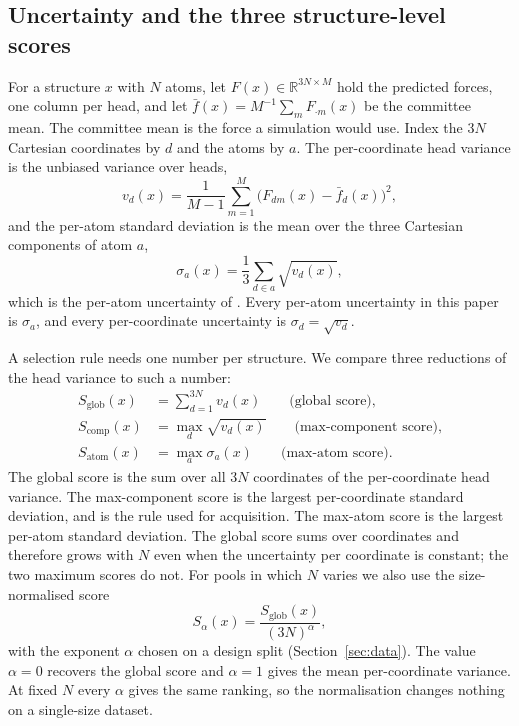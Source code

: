 \subsection{Uncertainty and the three structure-level scores}
\label{sec:scores}

For a structure $x$ with $N$ atoms, let $F(x)\in\mathbb{R}^{3N\times M}$ hold
the predicted forces, one column per head, and let
$\bar f(x)=M^{-1}\sum_{m}F_{\cdot m}(x)$ be the committee mean. The committee
mean is the force a simulation would use. Index the $3N$ Cartesian coordinates
by $d$ and the atoms by $a$. The per-coordinate head variance is the unbiased
variance over heads,
\begin{equation}
v_d(x)=\frac{1}{M-1}\sum_{m=1}^{M}\bigl(F_{dm}(x)-\bar f_d(x)\bigr)^2 ,
\label{eq:vd}
\end{equation}
and the per-atom standard deviation is the mean over the three Cartesian
components of atom $a$,
\begin{equation}
\sigma_a(x)=\frac{1}{3}\sum_{d\in a}\sqrt{v_d(x)} ,
\label{eq:sigma}
\end{equation}
which is the per-atom uncertainty of \citet{beck2025committee}. Every
per-atom uncertainty in this paper is $\sigma_a$, and every per-coordinate
uncertainty is $\sigma_d=\sqrt{v_d}$.

A selection rule needs one number per structure. We compare three reductions
of the head variance to such a number:
\begin{align}
S_{\mathrm{glob}}(x)&=\sum_{d=1}^{3N} v_d(x) \qquad\text{(global score),}
\label{eq:global}\\
S_{\mathrm{comp}}(x)&=\max_{d}\sqrt{v_d(x)} \qquad\text{(max-component score),}
\label{eq:maxcomp}\\
S_{\mathrm{atom}}(x)&=\max_{a}\sigma_a(x) \qquad\text{(max-atom score).}
\label{eq:maxatom}
\end{align}
The global score is the sum over all $3N$ coordinates of the per-coordinate
head variance. The max-component score is the largest per-coordinate standard
deviation, and is the rule \citet{beck2025committee} used for acquisition. The
max-atom score is the largest per-atom standard deviation. The global score
sums over coordinates and therefore grows with $N$ even when the uncertainty
per coordinate is constant; the two maximum scores do not. For pools in which
$N$ varies we also use the size-normalised score
\begin{equation}
S_{\alpha}(x)=\frac{S_{\mathrm{glob}}(x)}{(3N)^{\alpha}},
\label{eq:salpha}
\end{equation}
with the exponent $\alpha$ chosen on a design split
(Section~\ref{sec:data}). The value $\alpha=0$ recovers the global score and
$\alpha=1$ gives the mean per-coordinate variance. At fixed $N$ every $\alpha$
gives the same ranking, so the normalisation changes nothing on a single-size
dataset.


